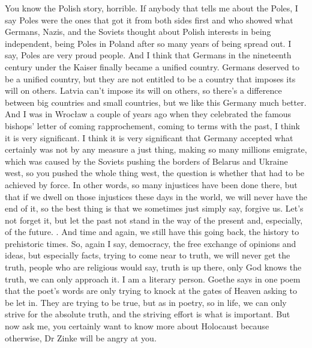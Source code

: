 You know the Polish story, horrible. If anybody that tells me about the Poles, I say Poles were the ones that got it from both sides first and who showed what Germans, Nazis, and the Soviets thought about Polish interests in being independent, being Poles in Poland after so many years of being spread out. I say, Poles are very proud people. And I think that Germans in the nineteenth century under the Kaiser finally became a unified country. Germans deserved to be a unified country, but they are not entitled to be a country that imposes its will on others. Latvia can't impose its will on others, so there's a difference between big countries and small countries, but we like this Germany much better. And I was in Wrocław a couple of years ago when they celebrated the famous bishops’ letter of coming rapprochement, coming to terms with the past, I think it is very significant. I think it is very significant that Germany accepted what certainly was not by any measure a just thing, making so many millions emigrate, which was caused by the Soviets pushing the borders of Belarus and Ukraine west, so you pushed the whole thing west, the question is whether that had to be achieved by force. In other words, so many injustices have been done there, but that if we dwell on those injustices these days in the world, we will never have the end of it, so the best thing is that we sometimes just simply say, forgive us. Let's not forget it, but let the past not stand in the way of the present and, especially, of the future. . And time and again, we still have this going back, the history to prehistoric times. So, again I say, democracy, the free exchange of opinions and ideas, but especially facts, trying to come near to truth, we will never get the truth, people who are religious would say, truth is up there, only God knows the truth, we can only approach it. I am a literary person. Goethe says in one poem that the poet’s words are only trying to knock at the gates of Heaven asking to be let in. They are trying to be true, but as in poetry, so in life, we can only strive for the absolute truth, and the striving effort is what is important. 
But now ask me, you certainly want to know more about Holocaust because otherwise, Dr Zinke will be angry at you. 
